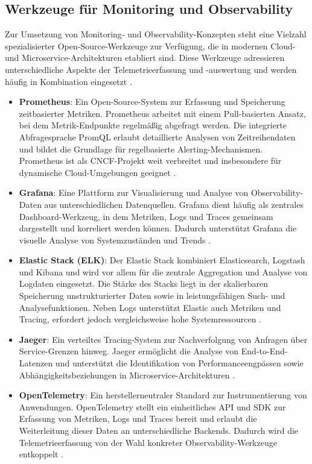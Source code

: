 \subsection{Werkzeuge für Monitoring und Observability}

Zur Umsetzung von Monitoring- und Observability-Konzepten steht eine Vielzahl spezialisierter Open-Source-Werkzeuge zur Verfügung, die in modernen Cloud- und Microservice-Architekturen etabliert sind. Diese Werkzeuge adressieren unterschiedliche Aspekte der Telemetrieerfassung und -auswertung und werden häufig in Kombination eingesetzt \cite{banerjee2024comparative}.

\begin{itemize}
\item \textbf{Prometheus}: Ein Open-Source-System zur Erfassung und Speicherung zeitbasierter Metriken. Prometheus arbeitet mit einem Pull-basierten Ansatz, bei dem Metrik-Endpunkte regelmäßig abgefragt werden. Die integrierte Abfragesprache PromQL erlaubt detaillierte Analysen von Zeitreihendaten und bildet die Grundlage für regelbasierte Alerting-Mechanismen. Prometheus ist als CNCF-Projekt weit verbreitet und insbesondere für dynamische Cloud-Umgebungen geeignet \cite{banerjee2024comparative}.
\item \textbf{Grafana}: Eine Plattform zur Visualisierung und Analyse von Observability-Daten aus unterschiedlichen Datenquellen. Grafana dient häufig als zentrales Dashboard-Werkzeug, in dem Metriken, Logs und Traces gemeinsam dargestellt und korreliert werden können. Dadurch unterstützt Grafana die visuelle Analyse von Systemzuständen und Trends \cite{giamattei2024monitoring}.
\item \textbf{Elastic Stack (ELK)}: Der Elastic Stack kombiniert Elasticsearch, Logstash und Kibana und wird vor allem für die zentrale Aggregation und Analyse von Logdaten eingesetzt. Die Stärke des Stacks liegt in der skalierbaren Speicherung unstrukturierter Daten sowie in leistungsfähigen Such- und Analysefunktionen. Neben Logs unterstützt Elastic auch Metriken und Tracing, erfordert jedoch vergleichsweise hohe Systemressourcen \cite{banerjee2024comparative}.
\item \textbf{Jaeger}: Ein verteiltes Tracing-System zur Nachverfolgung von Anfragen über Service-Grenzen hinweg. Jaeger ermöglicht die Analyse von End-to-End-Latenzen und unterstützt die Identifikation von Performanceengpässen sowie Abhängigkeitsbeziehungen in Microservice-Architekturen \cite{albuquerque2025tracing}.
\item \textbf{OpenTelemetry}: Ein herstellerneutraler Standard zur Instrumentierung von Anwendungen. OpenTelemetry stellt ein einheitliches API und SDK zur Erfassung von Metriken, Logs und Traces bereit und erlaubt die Weiterleitung dieser Daten an unterschiedliche Backends. Dadurch wird die Telemetrieerfassung von der Wahl konkreter Observability-Werkzeuge entkoppelt \cite{albuquerque2025tracing}.
\end{itemize}

